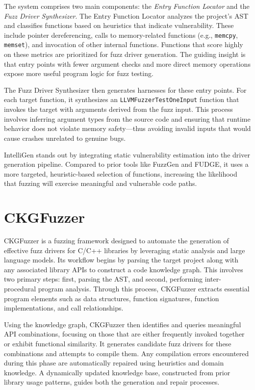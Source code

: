 \documentclass[
  a4paper,
]{scrreprt}
\theoremstyle{definition}
\theoremstyle{remark}
\begin{document}
The system comprises two main components: the \emph{Entry Function
Locator} and the \emph{Fuzz Driver Synthesizer}. The Entry Function
Locator analyzes the project's AST and classifies functions based on
heuristics that indicate vulnerability. These include pointer
dereferencing, calls to memory-related functions (e.g., \texttt{memcpy},
\texttt{memset}), and invocation of other internal functions. Functions
that score highly on these metrics are prioritized for fuzz driver
generation. The guiding insight is that entry points with fewer argument
checks and more direct memory operations expose more useful program
logic for fuzz testing.

The Fuzz Driver Synthesizer then generates harnesses for these entry
points. For each target function, it synthesizes an
\texttt{LLVMFuzzerTestOneInput} function that invokes the target with
arguments derived from the fuzz input. This process involves inferring
argument types from the source code and ensuring that runtime behavior
does not violate memory safety---thus avoiding invalid inputs that would
cause crashes unrelated to genuine bugs.

IntelliGen stands out by integrating static vulnerability estimation
into the driver generation pipeline. Compared to prior tools like
FuzzGen and FUDGE, it uses a more targeted, heuristic-based selection of
functions, increasing the likelihood that fuzzing will exercise
meaningful and vulnerable code paths.

\section{CKGFuzzer}\label{ckgfuzzer}

CKGFuzzer \autocite{xu2024} is a fuzzing framework designed to automate
the generation of effective fuzz drivers for C/C++ libraries by
leveraging static analysis and large language models. Its workflow
begins by parsing the target project along with any associated library
APIs to construct a code knowledge graph. This involves two primary
steps: first, parsing the AST, and second, performing inter-procedural
program analysis. Through this process, CKGFuzzer extracts essential
program elements such as data structures, function signatures, function
implementations, and call relationships.

Using the knowledge graph, CKGFuzzer then identifies and queries
meaningful API combinations, focusing on those that are either
frequently invoked together or exhibit functional similarity. It
generates candidate fuzz drivers for these combinations and attempts to
compile them. Any compilation errors encountered during this phase are
automatically repaired using heuristics and domain knowledge. A
dynamically updated knowledge base, constructed from prior library usage
patterns, guides both the generation and repair processes.
\end{document}
